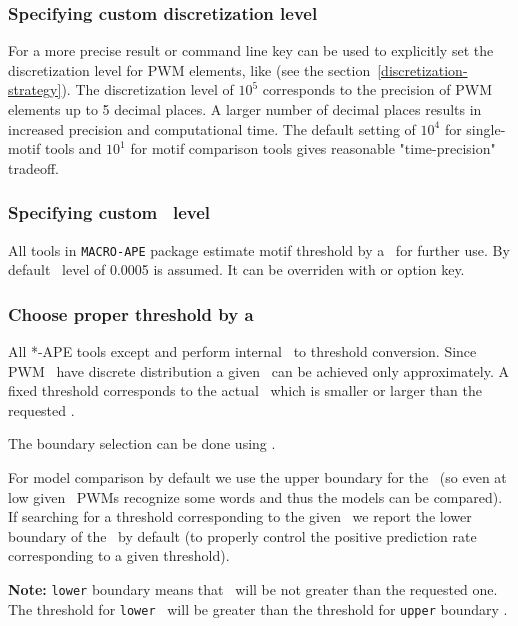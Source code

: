 \subsubsection{Specifying custom discretization level}
For a more precise result  or  command line key can be used to explicitly set
the discretization level for PWM elements, like  (see the section~\ref{discretization-strategy}).
The discretization level of $10^5$ corresponds to the precision of PWM elements up to 5 decimal places.
A larger number of decimal places results in increased precision and computational time.
The default setting of $10^4$ for single-motif tools and $10^1$ for motif comparison tools gives reasonable "time-precision" tradeoff.

\subsubsection{Specifying custom \pvalue\ level}
All tools in \texttt{MACRO-APE} package estimate motif threshold by a \pvalue\ for further use. By default \pvalue\ level of 0.0005 is assumed.
It can be overriden with  or  option key.

\subsubsection{Choose proper threshold by a \pvalue}
All *-APE tools except  and  perform internal \pvalue\ to threshold conversion.
Since PWM \pvalues\ have discrete distribution a given \pvalue\ can be achieved only approximately.
A fixed threshold corresponds to the actual \pvalue\ which is smaller or larger than the requested \pvalue.

The boundary selection can be done using .

For model comparison by default we use the upper boundary for the \pvalue~(so even at low given \pvalues\ PWMs recognize some words and thus the models can be 
compared). If searching for a threshold corresponding to the given \pvalue\ we report the lower boundary of the \pvalue\ by default (to properly control
the positive prediction rate corresponding to a given threshold).

\textbf{Note:} \texttt{lower} boundary means that \pvalue\ will be not greater than the requested one.
The threshold for \texttt{lower} \pvalue\ will be greater than the threshold for \texttt{upper} boundary \pvalue.


